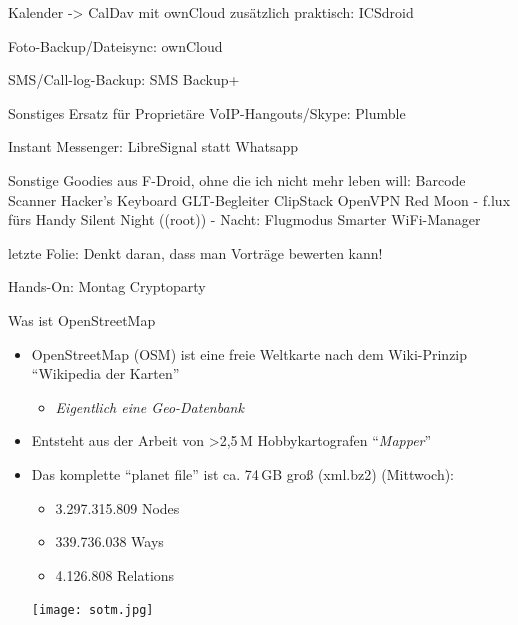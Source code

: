 \documentclass{beamer}
\begin{document}
   Kalender -> CalDav mit ownCloud 
     zusätzlich praktisch: ICSdroid
  
   Foto-Backup/Dateisync: ownCloud

   SMS/Call-log-Backup: SMS Backup+ 
    
 Sonstiges
   Ersatz für Proprietäre VoIP-Hangouts/Skype: Plumble

  Instant Messenger: LibreSignal statt Whatsapp

Sonstige Goodies aus F-Droid, ohne die ich nicht mehr leben will:
  Barcode Scanner
  Hacker's Keyboard
  GLT-Begleiter
  ClipStack
  OpenVPN
  Red Moon - f.lux fürs Handy
  Silent Night ((root)) - Nacht: Flugmodus
  Smarter WiFi-Manager


letzte Folie:
  Denkt daran, dass man Vorträge bewerten kann!

  Hands-On: Montag Cryptoparty



\begin{frame}{Was ist OpenStreetMap}

\begin{itemize}
  \item OpenStreetMap (OSM) ist eine freie Weltkarte nach dem Wiki-Prinzip "`Wikipedia der Karten"'
    \begin{itemize}
      \item \emph{Eigentlich eine Geo-Datenbank}
    \end{itemize}
\pause
  \item Entsteht aus der Arbeit von \textgreater 2,5\,M Hobbykartografen "`\emph{Mapper}"'

 \item Das komplette "`planet file"' ist ca. 74\,GB groß (xml.bz2) (Mittwoch):
  \begin{itemize}
    \item 3.297.315.809 Nodes
    \item 339.736.038 Ways
    \item 4.126.808 Relations
  \end{itemize}

 \begin{center}
 \texttt{[image: sotm.jpg]}
 \end{center}

\end{itemize}

\end{frame}
\end{document}
